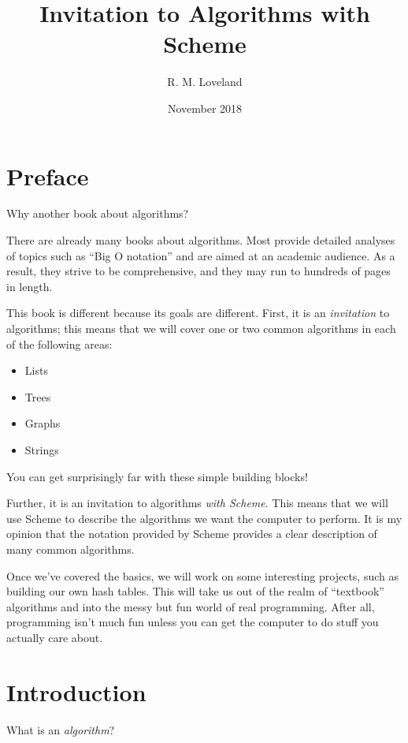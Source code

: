 \documentclass[12pt,openright,draft]{book}
\begin{document}
\title{Invitation to Algorithms with Scheme}
\author{R. M. Loveland}
\date{November 2018}

\frontmatter
\maketitle

\chapter{Preface}

Why another book about algorithms?

There are already many books about algorithms.  Most provide detailed
analyses of topics such as ``Big O notation'' and are aimed at an
academic audience.  As a result, they strive to be comprehensive, and
they may run to hundreds of pages in length.

This book is different because its goals are different.  First, it is
an \emph{invitation} to algorithms; this means that we will cover one or
two common algorithms in each of the following areas:

\begin{itemize}
\item Lists
\item Trees
\item Graphs
\item Strings
\end{itemize}

You can get surprisingly far with these simple building blocks!

Further, it is an invitation to algorithms \emph{with Scheme}.  This
means that we will use Scheme to describe the algorithms we want the
computer to perform.  It is my opinion that the notation provided by
Scheme provides a clear description of many common algorithms.

Once we've covered the basics, we will work on some interesting
projects, such as building our own hash tables.  This will take us out
of the realm of ``textbook'' algorithms and into the messy but fun world
of real programming.  After all, programming isn't much fun unless you
can get the computer to do stuff you actually care about.

\chapter{Introduction}

What is an \emph{algorithm}?
\end{document}
